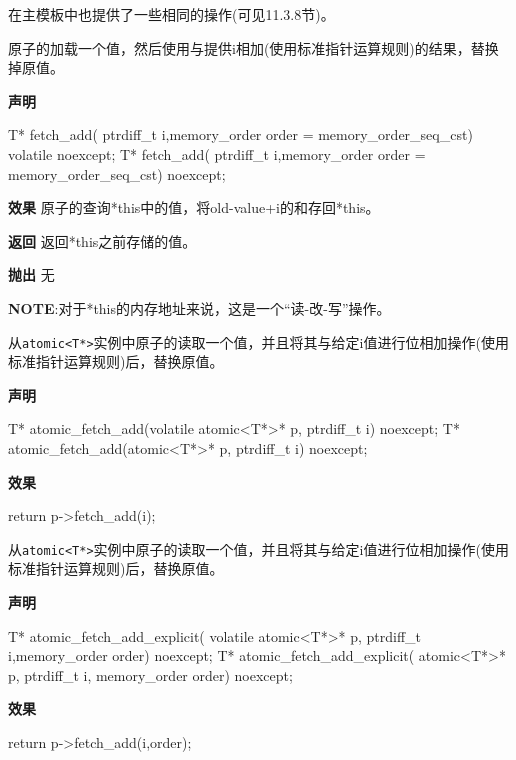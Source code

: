 在主模板中也提供了一些相同的操作(可见11.3.8节)。


原子的加载一个值，然后使用与提供i相加(使用标准指针运算规则)的结果，替换掉原值。

\textbf{声明}

\begin{cpp}
T* fetch_add(
    ptrdiff_t i,memory_order order = memory_order_seq_cst)
    volatile noexcept;
T* fetch_add(
    ptrdiff_t i,memory_order order = memory_order_seq_cst) noexcept;
\end{cpp}

\textbf{效果}
原子的查询*this中的值，将old-value+i的和存回*this。

\textbf{返回}
返回*this之前存储的值。

\textbf{抛出}
无

\textbf{NOTE}:对于*this的内存地址来说，这是一个“读-改-写”操作。


从\texttt{atomic<T*>}实例中原子的读取一个值，并且将其与给定i值进行位相加操作(使用标准指针运算规则)后，替换原值。

\textbf{声明}

\begin{cpp}
T* atomic_fetch_add(volatile atomic<T*>* p, ptrdiff_t i) noexcept;
T* atomic_fetch_add(atomic<T*>* p, ptrdiff_t i) noexcept;
\end{cpp}

\textbf{效果}

\begin{cpp}
return p->fetch_add(i);
\end{cpp}


从\texttt{atomic<T*>}实例中原子的读取一个值，并且将其与给定i值进行位相加操作(使用标准指针运算规则)后，替换原值。

\textbf{声明}

\begin{cpp}
T* atomic_fetch_add_explicit(
     volatile atomic<T*>* p, ptrdiff_t i,memory_order order) noexcept;
T* atomic_fetch_add_explicit(
     atomic<T*>* p, ptrdiff_t i, memory_order order) noexcept;
\end{cpp}

\textbf{效果}

\begin{cpp}
return p->fetch_add(i,order);
\end{cpp}

